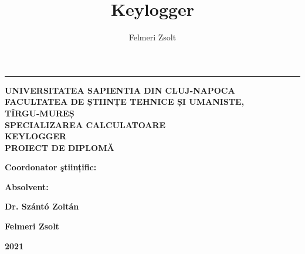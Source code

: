 \documentclass[a4paper, 11pt]{article}
\title{Keylogger}
\author{Felmeri Zsolt}
\date{}
\begin{document}
 
\begin{titlepage}
\noindent \rule[20pt]{\textwidth}{1pt}
\begin{centering}
\vspace{4pt}
{\fontsize{18pt}{1} \textbf{UNIVERSITATEA SAPIENTIA DIN CLUJ-NAPOCA}}\\ \vspace{4pt}
{\fontsize{16pt}{1} \textbf{FACULTATEA DE ȘTIINȚE TEHNICE ȘI UMANISTE,\\
TÎRGU-MUREȘ\\
SPECIALIZAREA CALCULATOARE}}\\
\vspace{10em}
{\fontsize{28pt}{1} \textbf{KEYLOGGER}} \\
\vspace{10em}
{\fontsize{24pt}{1} \textbf{PROIECT DE DIPLOMĂ}}\\
\end{centering}

\vspace{15em}
\begin{noindent}
{\fontsize{16pt}{1} \textbf{Coordonator ştiințific:}}
\begin{hfill}
{\fontsize{16pt}{1} \textbf{Absolvent:}}
\end{hfill}
\end{noindent}

\begin{noindent}
\hspace{2.5em}
{\fontsize{14pt}{1} \textbf{Dr. Szántó Zoltán}}
\begin{hfill}
{\fontsize{14pt}{1} \textbf{Felmeri Zsolt}}
\end{hfill}
\end{noindent}

\vspace{5em}
\centering
{\fontsize{28pt}{1} \textbf{2021}}
\end{titlepage}
\end{document}
